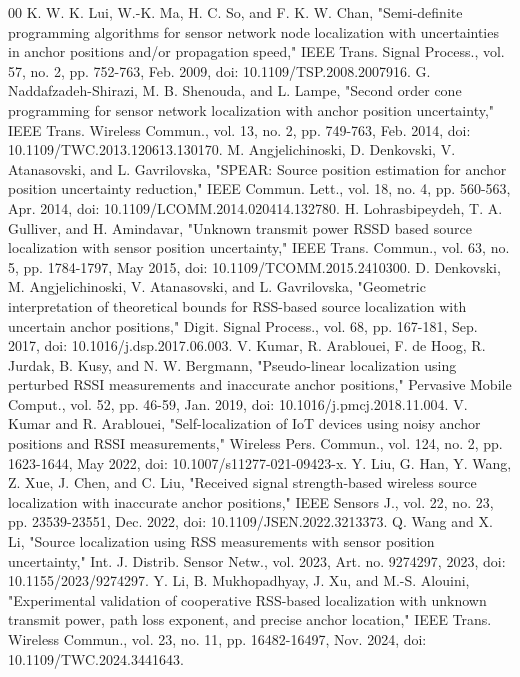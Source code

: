\documentclass[11pt,a4paper]{article}
\begin{document}
\nocite{ref22}
\begingroup\small
\begin{thebibliography}{00}
 K. W. K. Lui, W.-K. Ma, H. C. So, and F. K. W. Chan, "Semi-definite programming algorithms for sensor network node localization with uncertainties in anchor positions and/or propagation speed," IEEE Trans. Signal Process., vol. 57, no. 2, pp. 752-763, Feb. 2009, doi: 10.1109/TSP.2008.2007916.
 G. Naddafzadeh-Shirazi, M. B. Shenouda, and L. Lampe, "Second order cone programming for sensor network localization with anchor position uncertainty," IEEE Trans. Wireless Commun., vol. 13, no. 2, pp. 749-763, Feb. 2014, doi: 10.1109/TWC.2013.120613.130170.
 M. Angjelichinoski, D. Denkovski, V. Atanasovski, and L. Gavrilovska, "SPEAR: Source position estimation for anchor position uncertainty reduction," IEEE Commun. Lett., vol. 18, no. 4, pp. 560-563, Apr. 2014, doi: 10.1109/LCOMM.2014.020414.132780.
 H. Lohrasbipeydeh, T. A. Gulliver, and H. Amindavar, "Unknown transmit power RSSD based source localization with sensor position uncertainty," IEEE Trans. Commun., vol. 63, no. 5, pp. 1784-1797, May 2015, doi: 10.1109/TCOMM.2015.2410300.
 D. Denkovski, M. Angjelichinoski, V. Atanasovski, and L. Gavrilovska, "Geometric interpretation of theoretical bounds for RSS-based source localization with uncertain anchor positions," Digit. Signal Process., vol. 68, pp. 167-181, Sep. 2017, doi: 10.1016/j.dsp.2017.06.003.
 V. Kumar, R. Arablouei, F. de Hoog, R. Jurdak, B. Kusy, and N. W. Bergmann, "Pseudo-linear localization using perturbed RSSI measurements and inaccurate anchor positions," Pervasive Mobile Comput., vol. 52, pp. 46-59, Jan. 2019, doi: 10.1016/j.pmcj.2018.11.004.
 V. Kumar and R. Arablouei, "Self-localization of IoT devices using noisy anchor positions and RSSI measurements," Wireless Pers. Commun., vol. 124, no. 2, pp. 1623-1644, May 2022, doi: 10.1007/s11277-021-09423-x.
 Y. Liu, G. Han, Y. Wang, Z. Xue, J. Chen, and C. Liu, "Received signal strength-based wireless source localization with inaccurate anchor positions," IEEE Sensors J., vol. 22, no. 23, pp. 23539-23551, Dec. 2022, doi: 10.1109/JSEN.2022.3213373.
 Q. Wang and X. Li, "Source localization using RSS measurements with sensor position uncertainty," Int. J. Distrib. Sensor Netw., vol. 2023, Art. no. 9274297, 2023, doi: 10.1155/2023/9274297.
 Y. Li, B. Mukhopadhyay, J. Xu, and M.-S. Alouini, "Experimental validation of cooperative RSS-based localization with unknown transmit power, path loss exponent, and precise anchor location," IEEE Trans. Wireless Commun., vol. 23, no. 11, pp. 16482-16497, Nov. 2024, doi: 10.1109/TWC.2024.3441643.

\end{thebibliography}
\end{document}
